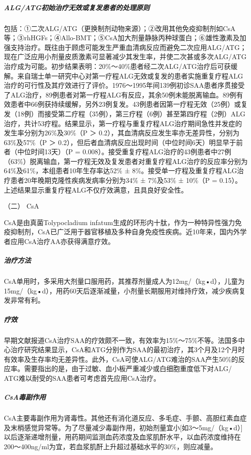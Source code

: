 \subparagraph{ALG/ATG初始治疗无效或复发患者的处理原则}

包括：①二次ALG/ATG（更换制剂动物来源）；②改用其他免疫抑制剂如CsA等；③rhHGFs；④Allo-BMT；⑤CsA加大剂量静脉丙种球蛋白；⑥雄性激素及加强支持治疗。既往由于顾虑可能发生严重血清病反应而避免二次应用ALG/ATG；现在广泛应用小剂量皮质激素可显著减少其发生率，并使二次甚或多次ALG/ATG治疗成为可能。初步结果表明：20\%～40\%患者经二次ALG/ATG治疗后可获缓解。来自瑞士单一研究中心对第一疗程ALG无效或复发的患者实施重复疗程ALG治疗的可行性及其疗效进行了评价。1976～1995年间139例初诊SAA患者序贯接受了ALG治疗，89例患者对第一疗程ALG有反应，其余50例未能脱离输血。89例有效患者中66例获持续缓解，另外23例复发。43例患者因第一疗程无效（25例）或复发（18例）而接受第二疗程（35例），第三疗程（6例）甚至第四疗程（2例）ALG治疗，共计53疗程。结果显示，第一疗程与重复疗程ALG治疗期间急性并发症的发生率分别为26\%及30\%（P
＞ 0.2），其血清病反应发生率亦无差异性，分别为63\%及57\%（P ＞
0.2），但后者血清病反应出现时间（中位时间6天）明显早于前者（中位时间13天）（P
=
0.008）。接受重复疗程ALG治疗的43例患者中27例（63\%）脱离输血，第一疗程无效及复发患者对重复疗程ALG治疗的反应率分别为64\%及61\%，本组患者10年生存率达52\%
±
8\%。接受单一疗程及重复疗程ALG治疗患者20年晚期克隆性疾病发病率分别为34\%
± 7\%及53\% ± 10\%（P =
0.15）。上述结果显示重复疗程ALG不仅疗效满意，且具良好安全性。

\hypertarget{text00089.htmlux5cux23CHP3-10-1-3-3-2}{}
（二） CsA

CsA是由真菌Tolypocladium
infatum生成的环形内十肽，作为一种特异性强力免疫抑制剂，CsA已广泛用于器官移植及多种自身免疫性疾病。近10年来，国内外学者应用CsA治疗AA亦获得满意疗效。

\subparagraph{治疗方法}

CsA单用时，多采用大剂量口服用药，其推荐剂量成人为12mg/（kg•d），儿童为15mg/（kg•d），用药60天后逐渐减量，小剂量长期服用对维持疗效，减少疾病复发非常有利。

\subparagraph{疗效}

早期文献报道CsA治疗SAA的疗效颇不一致，有效率为15\%～75\%不等。法国多中心治疗研究结果显示，CsA和ATG分别作为SAA的最初治疗，其3个月及12个月时有效率及生存率均无差异性。此外，CsA可使ALG/ATG难治的SAA产生50\%的反应率。需要指出的是，由于过敏、血小板严重减少或白细胞重度低下对ALG/
ATG难以耐受的SAA患者可考虑首先应用CsA治疗。

\subparagraph{CsA毒副作用}

CsA主要毒副作用为肾毒性。其他还有消化道反应、多毛症、手颤、高胆红素血症及末梢感觉异常等。为了尽量减少毒副作用，初始剂量宜小{[}如3～5mg/（kg•d）{]}以后逐渐递增剂量，用药期间监测血药浓度及血浆肌酐水平，以血药浓度维持在200～400ng/ml为宜，若血浆肌酐上升超过基础水平的30\%，则应减量。

